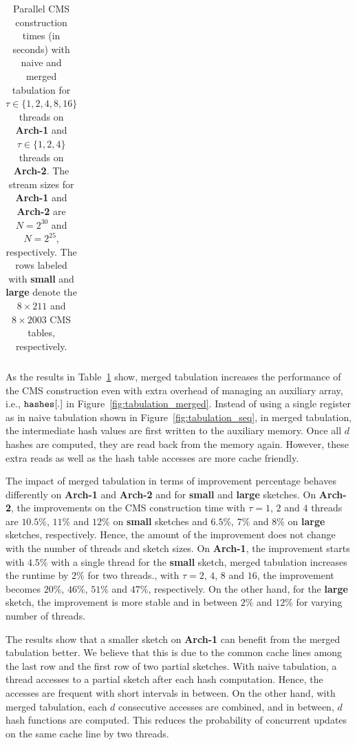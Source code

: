 \documentclass[10pt, conference, compsocconf]{IEEEtran}
\begin{document}
\begin{table}[htbp]
{\begin{tabular}{ccccc||rrrrr|rrrrr}
\end{tabular}
}
\caption{Parallel CMS construction times (in seconds) with naive and merged tabulation for $\tau \in \{1, 2, 4, 8, 16\}$ threads on \textbf{Arch-1} and  $\tau \in \{1, 2, 4\}$ threads on \textbf{Arch-2}. The stream sizes for \textbf{Arch-1} and \textbf{Arch-2} are $N = 2^{30}$ and $N = 2^{25}$, respectively. The rows labeled with {\bf small} and {\bf large} denote the $8 \times 211$ and $8 \times 2003$ CMS tables, respectively. } \label{tbl:mergedtbl}

\end{table}

As the results in Table~\ref{tbl:mergedtbl} show, merged tabulation increases the performance of the CMS construction even with extra overhead of managing an auxiliary array, i.e., $\tt hashes[.]$ in Figure~\ref{fig:tabulation_merged}. Instead of using a single register as in naive tabulation shown in Figure~\ref{fig:tabulation_seq}, in merged tabulation, the intermediate hash values are first written to the auxiliary memory. Once all $d$ hashes are computed, they are read back from the memory again. However, these extra reads as well as the hash table accesses are more cache friendly.

The impact of merged tabulation in terms of improvement percentage behaves differently on {\bf Arch-1} and {\bf Arch-2} and for {\bf small} and {\bf large} sketches. On {\bf Arch-2}, the improvements on the CMS construction time with $\tau = 1$, $2$ and $4$ threads are $10.5\%$, $11\%$ and $12\%$ on {\bf small} sketches and $6.5\%$, $7\%$ and $8\%$ on {\bf large} sketches, respectively.  Hence, the amount of the improvement does not change with the number of threads and sketch sizes. On {\bf Arch-1}, the improvement starts with $4.5\%$ with a single thread for the {\bf small} sketch, merged tabulation increases the runtime by $2\%$ for two threads., with $\tau = 2$, $4$, $8$ and $16$, the improvement becomes $20\%$, $46\%$, $51\%$ and $47\%$, respectively. On the other hand, for the {\bf large} sketch, the improvement is more stable and in between $2\%$ and $12\%$ for varying number of threads.

The results show that a smaller sketch on {\bf Arch-1} can benefit from the merged tabulation better. We believe that this is due to the common cache lines among the last row and the first row of two partial sketches. With naive tabulation, a thread accesses to a partial sketch after each hash computation. Hence, the accesses are frequent  with short intervals in between. On the other hand, with merged tabulation, each $d$ consecutive accesses are combined, and in between, $d$ hash functions are computed. This reduces the probability of concurrent updates on the same cache line by two threads.  
\end{document}
